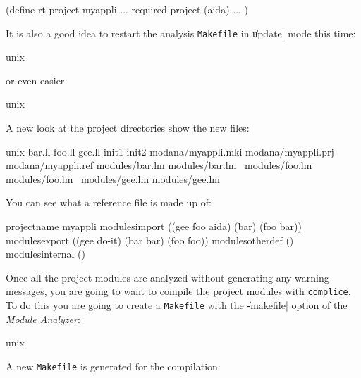 \begin{Longcode*}
(define-rt-project myappli
         ...
        required-project (aida)
         ...
)
\end{Longcode*}

It is also a good idea to restart the analysis {\tt Makefile} in \|update| mode this time:
\begin{Longcode*}
unix%
\end{Longcode*}
or even easier
\begin{Longcode*}
unix%
\end{Longcode*}
A new look at the project directories show the new files:
\begin{Longcode*}
unix%
bar.ll
foo.ll
gee.ll
init1
init2
modana/myappli.mki
modana/myappli.prj
modana/myappli.ref
modules/bar.lm
modules/bar.lm~
modules/foo.lm
modules/foo.lm~
modules/gee.lm
modules/gee.lm~
\end{Longcode*}

You can see what a reference file is made up of:

\begin{Longcode*}
projectname
myappli
modulesimport
((gee foo aida) (bar) (foo bar))
modulesexport
((gee do-it) (bar bar) (foo foo))
modulesotherdef
()
modulesinternal
()
\end{Longcode*}

Once all the project modules are analyzed without generating any warning messages, you are going to want to compile the project modules with {\tt complice}.
To do this you are going to create a {\tt Makefile} with the \|-makefile| option of the {\em Module Analyzer}:

\begin{Longcode*}
unix%
\end{Longcode*}

A new {\tt Makefile} is generated for the compilation:

